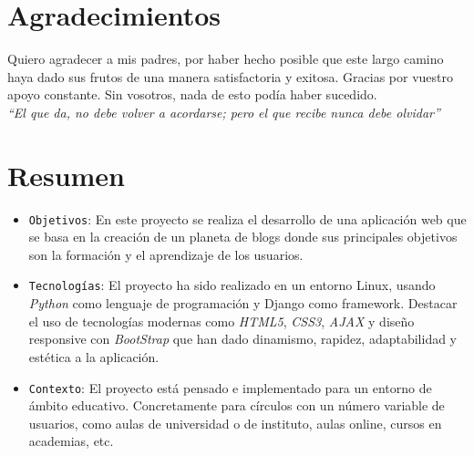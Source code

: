 \documentclass[a4paper, 12pt]{book}
\begin{document}
\newpage
\mbox{}
\thispagestyle{empty} %





\chapter*{Agradecimientos}
Quiero agradecer a mis padres, por haber hecho posible que este largo camino haya dado sus frutos de una manera satisfactoria y exitosa. 
Gracias por vuestro apoyo constante. Sin vosotros, nada de esto pod\'ia haber sucedido.\\

\textit{``El que da, no debe volver a acordarse; pero el que recibe nunca debe olvidar''}\\


\chapter*{Resumen}
\begin{itemize}
  \item \texttt{Objetivos}: En este proyecto se realiza el desarrollo de una aplicaci\'on web que se basa en la creaci\'on de un planeta de 
  blogs donde sus principales objetivos son la formaci\'on y el aprendizaje de los usuarios.

  \item \texttt{Tecnolog\'ias}: El proyecto ha sido realizado en un entorno Linux, usando \textit{Python} como lenguaje de programaci\'on y Django como 
  framework. Destacar el uso de tecnolog\'ias modernas como \textit{HTML5}, \textit{CSS3}, \textit{AJAX} y dise\~no responsive con \textit{BootStrap} que han dado dinamismo, rapidez, adaptabilidad y 
  est\'etica a la aplicaci\'on.

  \item \texttt{Contexto}: El proyecto est\'a pensado e implementado para un entorno de \'ambito educativo. Concretamente para c\'irculos con un n\'umero variable de 
  usuarios, como aulas de universidad o de instituto, aulas online, cursos en academias, etc.
\end{itemize}
\end{document}
